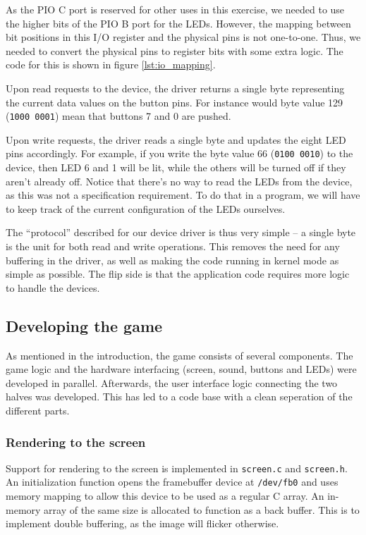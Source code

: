 As the PIO C port is reserved for other uses in this exercise, we needed
to use the higher bits of the PIO B port for the LEDs. However, the
mapping between bit positions in this I/O register and the physical pins
is not one-to-one. Thus, we needed to convert the physical pins to
register bits with some extra logic. The code for this is shown in
figure \ref{lst:io_mapping}.



Upon read requests to the device, the driver returns a single byte
representing the current data values on the button pins. For instance
would byte value 129 (\texttt{1000 0001}) mean that buttons 7 and 0 are
pushed.

Upon write requests, the driver reads a single byte and updates the
eight LED pins accordingly. For example, if you write the byte value 66
(\texttt{0100 0010}) to the device, then LED 6 and 1 will be lit, while
the others will be turned off if they aren't already off. Notice that
there's no way to read the LEDs from the device, as this was not a
specification requirement. To do that in a program, we will have to keep
track of the current configuration of the LEDs ourselves.

The ``protocol'' described for our device driver is thus very simple --
a single byte is the unit for both read and write operations. This
removes the need for any buffering in the driver, as well as making the
code running in kernel mode as simple as possible. The flip side is that
the application code requires more logic to handle the devices.

\subsection{Developing the game}

As mentioned in the introduction, the game consists of several components. The
game logic and the hardware interfacing (screen, sound, buttons and
LEDs) were developed in parallel. Afterwards, the user interface logic
connecting the two halves was developed. This has led to a code base
with a clean seperation of the different parts.



\subsubsection{Rendering to the screen}

Support for rendering to the screen is implemented in \texttt{screen.c}
and \texttt{screen.h}. An initialization function opens the framebuffer
device at \texttt{/dev/fb0} and uses memory mapping to allow this device
to be used as a regular C array. An in-memory array of the same size is
allocated to function as a back buffer. This is to implement double
buffering, as the image will flicker otherwise.

